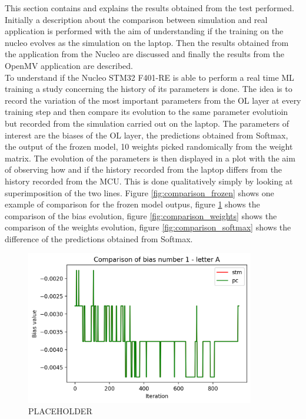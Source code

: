 \documentclass[12pt]{report}
\begin{document}
This section contains and explains the results obtained from the test performed. Initially a description about the comparison between simulation and real application is performed with the aim of understanding if the training on the nucleo evolves as the simulation on the laptop. Then the results obtained from the application from the Nucleo are discussed and finally the results from the OpenMV application are described.\\
To understand if the Nucleo STM32 F401-RE is able to perform a real time ML training a study concerning the history of its parameters is done. The idea is to record the variation of the most important parameters from the OL layer at every training step and then compare its evolution to the same parameter evolutioin but recorded from the simulation carried out on the laptop. The parameters of interest are the biases of the OL layer, the predictions obtained from Softmax, the output of the frozen model, 10 weights picked randomically from the weight matrix. The evolution of the parameters is then displayed in a plot with the aim of observing how and if the history recorded from the laptop differs from the history recorded from the MCU. This is done qualitatively simply by looking at superimposition of the two lines. Figure \ref{fig:comparison_frozen} shows one example of comparison for the frozen model outpus, figure \ref{fig:comparison_bias} shows the comparison of the bias evolution, figure \ref{fig:comparison_weights} shows the comparison of the weights evolution, figure \ref{fig:comparison_softmax} shows the difference of the predictions obtained from Softmax.
%
\begin{figure}[h!]
    \centering
    \includegraphics[width=100mm]{Figures/Chapter5/bias_example.png} 
    \caption{PLACEHOLDER}
    \label{fig:comparison_bias}    
\end{figure}
%
%
\end{document}
